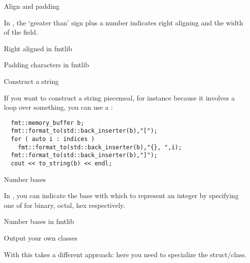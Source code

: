  {Align and padding}

In , the `greater than' sign plus a number indicates
right aligning and the width of the field.

\begin{block}{Right aligned in fmtlib}
  \label{sl:fmtwidth}
\end{block}

\begin{block}{Padding characters in fmtlib}
  \label{sl:fmtleftpad}
\end{block}

 {Construct a string}

If you want to construct a string piecemeal,
for instance because it involves a loop over something,
you can use a :
\begin{lstlisting}
  fmt::memory_buffer b;
  fmt::format_to(std::back_inserter(b),"[");
  for ( auto i : indices )
    fmt::format_to(std::back_inserter(b),"{}, ",i);
  fmt::format_to(std::back_inserter(b),"]");
  cout << to_string(b) << endl;
\end{lstlisting}

 {Number bases}

In , you can indicate the base with which to represent an integer
by specifying one of  for binary, octal, hex respectively.

\begin{block}{Number bases in fmtlib}
  \label{sl:fmtbase}
\end{block}

 {Output your own classes}

With  this takes a different approach:
here you need to specialize the  struct/class.
%

